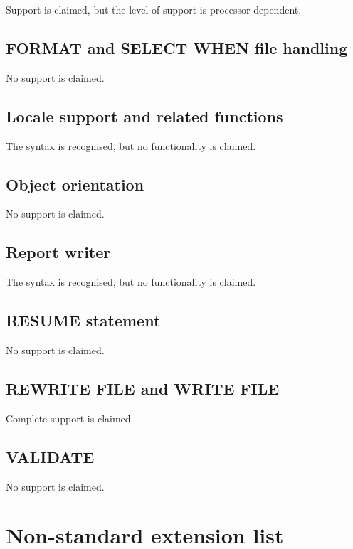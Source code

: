 Support is claimed, but the level of support is processor-dependent.

\subsection{FORMAT and SELECT WHEN file handling}

No support is claimed.

\subsection{Locale support and related functions}

The syntax is recognised, but no functionality is claimed.

\subsection{Object orientation}

No support is claimed.

\subsection{Report writer}

The syntax is recognised, but no functionality is claimed.

\subsection{RESUME statement}

No support is claimed.

\subsection{REWRITE FILE and WRITE FILE}

Complete support is claimed.

\subsection{VALIDATE}

No support is claimed.

\section{Non-standard extension list}

